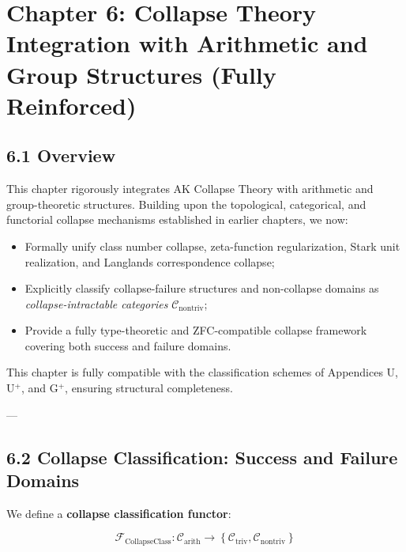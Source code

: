 \documentclass[11pt]{article}
\begin{document}

\section{Chapter 6: Collapse Theory Integration with Arithmetic and Group Structures (Fully Reinforced)}

\subsection*{6.1 Overview}

This chapter rigorously integrates AK Collapse Theory with arithmetic and group-theoretic structures. Building upon the topological, categorical, and functorial collapse mechanisms established in earlier chapters, we now:

\begin{itemize}
    \item Formally unify class number collapse, zeta-function regularization, Stark unit realization, and Langlands correspondence collapse;
    \item Explicitly classify collapse-failure structures and non-collapse domains as \emph{collapse-intractable categories} \( \mathcal{C}_{\mathrm{nontriv}} \);
    \item Provide a fully type-theoretic and ZFC-compatible collapse framework covering both success and failure domains.
\end{itemize}

This chapter is fully compatible with the classification schemes of Appendices U, U$^{+}$, and G$^{+}$, ensuring structural completeness.

---

\subsection*{6.2 Collapse Classification: Success and Failure Domains}

We define a \textbf{collapse classification functor}:

\[
\mathcal{F}_{\mathrm{CollapseClass}} : \mathcal{C}_{\mathrm{arith}} \longrightarrow \left\{ \mathcal{C}_{\mathrm{triv}}, \mathcal{C}_{\mathrm{nontriv}} \right\}
\]
\end{document}

